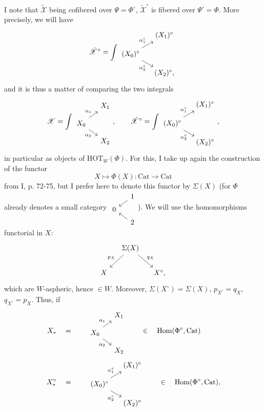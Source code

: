 \documentclass[11pt]{article}
\newcommand{\printedpage}[1]{\marginpar{\footnotesize p.~#1}}
\newcommand{\msp}[1]{\marginpar{\footnotesize [#1]}}
\newcommand{\Cat}{\mathrm{Cat}}
\newcommand{\Hom}{\mathrm{Hom}}
\newcommand{\HOT}{\mathrm{HOT}}
\newcommand{\sX}{\mathscr{X}}
\newcommand{\tsX}{\tilde{\mathscr{X}}}
\begin{document}
\printedpage{93}

I note that $\tsX$ being cofibered over $\Psi=\Phi^\circ$, $\tsX^\circ$ is fibered over $\Psi^\circ=\Phi$. More precisely, we will have
\[
\tsX^\circ = \int
\begin{tikzcd}[row sep=small, column sep=small]
 & (X_1)^\circ \\
(X_0)^\circ \arrow[ur, "\alpha_1^\circ"] \arrow[dr, "\alpha_2^\circ"'] & \\
 & (X_2)^\circ,
\end{tikzcd}
\]
\msp{page 137}
and it is thus a matter of comparing the two integrals
\[
\sX = \int
\begin{tikzcd}[row sep=small, column sep=small]
 & X_1 \\
X_0 \arrow[ur, "\alpha_1"] \arrow[dr, "\alpha_2"'] & \\
 & X_2
\end{tikzcd}
, \qquad
\tsX^\circ = \int
\begin{tikzcd}[row sep=small, column sep=small]
 & (X_1)^\circ \\
(X_0)^\circ \arrow[ur, "\alpha_1^\circ"] \arrow[dr, "\alpha_2^\circ"'] & \\
 & (X_2)^\circ
\end{tikzcd}
,
\]
in particular as objects of $\HOT_W(\Phi)$. For this, I take up again the construction of the functor
\[
X \longmapsto \Phi(X) : \Cat \longrightarrow \Cat
\]
from I, p. 72-75, but I prefer here to denote this functor by $\Sigma(X)$ (for $\Phi$ already denotes a small category $\begin{tikzcd}[row sep=tiny, column sep=small]
 & 1 \arrow[dl] \\
0 & \\
 & 2 \arrow[ul]
\end{tikzcd}$). We will use the homomorphisms functorial in $X$:
\[
\begin{tikzcd}[column sep=small]
 & \Sigma(X) \arrow[dl, "p_X"'] \arrow[dr, "q_X"] & \\
X & & X^\circ,
\end{tikzcd}
\]
which are $W$-aspheric, hence $\in W$. Moreover, $\Sigma(X^\circ)=\Sigma(X)$, $p_{X^\circ}=q_X$, $q_{X^\circ}=p_X$. Thus, if
\[
\begin{aligned}
X_* \quad &= \qquad
\begin{tikzcd}[ampersand replacement=\&, row sep=small, column sep=small]
 \& X_1 \\
X_0 \arrow[ur, "\alpha_1"] \arrow[dr, "\alpha_2"'] \& \\
 \& X_2
\end{tikzcd}
\qquad \in \quad \Hom(\Phi^\circ,\Cat)\\
X_*^\circ \quad &= \qquad
\begin{tikzcd}[ampersand replacement=\&, row sep=small, column sep=small]
 \& (X_1)^\circ \\
(X_0)^\circ \arrow[ur, "\alpha_1^\circ"] \arrow[dr, "\alpha_2^\circ"'] \& \\
 \& (X_2)^\circ
\end{tikzcd}
\qquad \in \quad \Hom(\Phi^\circ,\Cat),
\end{aligned}
\]
\end{document}
